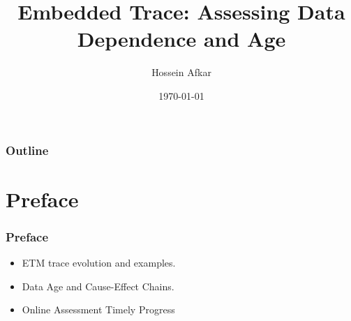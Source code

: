 \documentclass{beamer}
\title[Embedded Trace]
{Embedded Trace: Assessing Data Dependence and Age}
\author[]{Hossein Afkar}
\institute{DRTS Lab}
\date{\today}
\begin{document}

\frame{\titlepage}

\begin{frame}
    \frametitle{Outline}
    \tableofcontents[hideallsubsections]
\end{frame}


\section{Preface}
\begin{frame}
    \frametitle{Preface}
    \begin{itemize}
        \item ETM trace evolution and examples.
        \item Data Age and Cause-Effect Chains.
        \item Online Assessment Timely Progress
    \end{itemize}
\end{frame}
\end{document}
